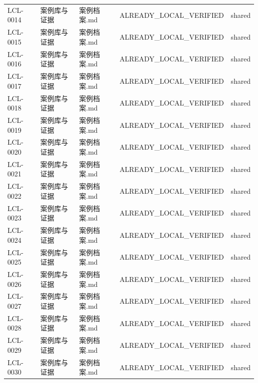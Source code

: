 \documentclass[UTF8,openany,oneside,11pt]{ctexbook}
\begin{document}
\begin{longtable}{L{1.4cm}L{2.4cm}L{6.0cm}L{3.0cm}L{1.8cm}}
LCL-\allowbreak{}0014 & 案例库与证据 & 案例档案.md & ALREADY\_\allowbreak{}LOCAL\_\allowbreak{}VERIFIED & shared \\
LCL-\allowbreak{}0015 & 案例库与证据 & 案例档案.md & ALREADY\_\allowbreak{}LOCAL\_\allowbreak{}VERIFIED & shared \\
LCL-\allowbreak{}0016 & 案例库与证据 & 案例档案.md & ALREADY\_\allowbreak{}LOCAL\_\allowbreak{}VERIFIED & shared \\
LCL-\allowbreak{}0017 & 案例库与证据 & 案例档案.md & ALREADY\_\allowbreak{}LOCAL\_\allowbreak{}VERIFIED & shared \\
LCL-\allowbreak{}0018 & 案例库与证据 & 案例档案.md & ALREADY\_\allowbreak{}LOCAL\_\allowbreak{}VERIFIED & shared \\
LCL-\allowbreak{}0019 & 案例库与证据 & 案例档案.md & ALREADY\_\allowbreak{}LOCAL\_\allowbreak{}VERIFIED & shared \\
LCL-\allowbreak{}0020 & 案例库与证据 & 案例档案.md & ALREADY\_\allowbreak{}LOCAL\_\allowbreak{}VERIFIED & shared \\
LCL-\allowbreak{}0021 & 案例库与证据 & 案例档案.md & ALREADY\_\allowbreak{}LOCAL\_\allowbreak{}VERIFIED & shared \\
LCL-\allowbreak{}0022 & 案例库与证据 & 案例档案.md & ALREADY\_\allowbreak{}LOCAL\_\allowbreak{}VERIFIED & shared \\
LCL-\allowbreak{}0023 & 案例库与证据 & 案例档案.md & ALREADY\_\allowbreak{}LOCAL\_\allowbreak{}VERIFIED & shared \\
LCL-\allowbreak{}0024 & 案例库与证据 & 案例档案.md & ALREADY\_\allowbreak{}LOCAL\_\allowbreak{}VERIFIED & shared \\
LCL-\allowbreak{}0025 & 案例库与证据 & 案例档案.md & ALREADY\_\allowbreak{}LOCAL\_\allowbreak{}VERIFIED & shared \\
LCL-\allowbreak{}0026 & 案例库与证据 & 案例档案.md & ALREADY\_\allowbreak{}LOCAL\_\allowbreak{}VERIFIED & shared \\
LCL-\allowbreak{}0027 & 案例库与证据 & 案例档案.md & ALREADY\_\allowbreak{}LOCAL\_\allowbreak{}VERIFIED & shared \\
LCL-\allowbreak{}0028 & 案例库与证据 & 案例档案.md & ALREADY\_\allowbreak{}LOCAL\_\allowbreak{}VERIFIED & shared \\
LCL-\allowbreak{}0029 & 案例库与证据 & 案例档案.md & ALREADY\_\allowbreak{}LOCAL\_\allowbreak{}VERIFIED & shared \\
LCL-\allowbreak{}0030 & 案例库与证据 & 案例档案.md & ALREADY\_\allowbreak{}LOCAL\_\allowbreak{}VERIFIED & shared \\

\end{longtable}
\end{document}
